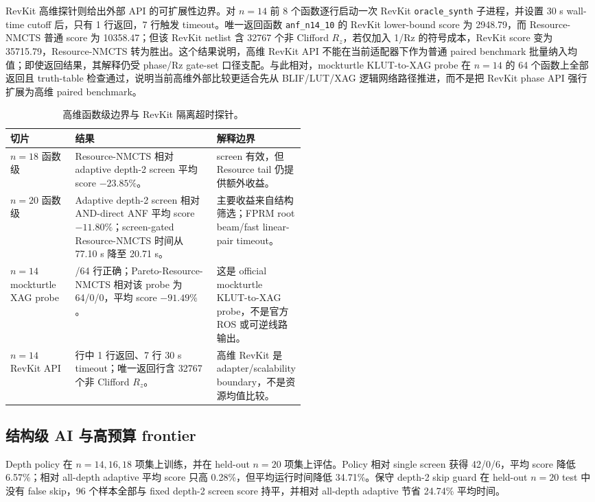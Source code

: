 \documentclass[UTF8,fontset=macnew,11pt]{ctexart}
\newcommand{\method}{Resource-NMCTS}
\begin{document}
RevKit 高维探针则给出外部 API 的可扩展性边界。对 $n=14$ 前 8 个函数逐行启动一次 RevKit \texttt{oracle\_synth} 子进程，并设置 30 s wall-time cutoff 后，只有 1 行返回，7 行触发 timeout。唯一返回函数 \texttt{anf\_n14\_10} 的 RevKit lower-bound score 为 2948.79，而 \method{} 普通 score 为 10358.47；但该 RevKit netlist 含 32767 个非 Clifford $R_z$，若仅加入 1/Rz 的符号成本，RevKit score 变为 35715.79，\method{} 转为胜出。这个结果说明，高维 RevKit API 不能在当前适配器下作为普通 paired benchmark 批量纳入均值；即使返回结果，其解释仍受 phase/Rz gate-set 口径支配。与此相对，mockturtle KLUT-to-XAG probe 在 $n=14$ 的 64 个函数上全部返回且 truth-table 检查通过，说明当前高维外部比较更适合先从 BLIF/LUT/XAG 逻辑网络路径推进，而不是把 RevKit phase API 强行扩展为高维 paired benchmark。

\begin{table}[H]
\centering
\scriptsize
\caption{高维函数级边界与 RevKit 隔离超时探针。}
\label{tab:highdim-v27}
\begin{tabularx}{\linewidth}{>{\raggedright\arraybackslash}p{0.22\linewidth}>{\raggedright\arraybackslash}X>{\raggedright\arraybackslash}p{0.28\linewidth}}
\toprule
切片 & 结果 & 解释边界 \\
\midrule
$n=18$ 函数级 & \method{} 相对 adaptive depth-2 screen 平均 score $-23.85\%$。 & screen 有效，但 Resource tail 仍提供额外收益。 \\
$n=20$ 函数级 & Adaptive depth-2 screen 相对 AND-direct ANF 平均 score $-11.80\%$；screen-gated \method{} 时间从 77.10 s 降至 20.71 s。 & 主要收益来自结构筛选；FPRM root beam/fast linear-pair timeout。 \\
$n=14$ mockturtle XAG probe & 64/64 行正确；Pareto-\method{} 相对该 probe 为 64/0/0，平均 score $-91.49\%$。 & 这是 official mockturtle KLUT-to-XAG probe，不是官方 ROS 或可逆线路输出。 \\
$n=14$ RevKit API & 8 行中 1 行返回、7 行 30 s timeout；唯一返回行含 32767 个非 Clifford $R_z$。 & 高维 RevKit 是 adapter/scalability boundary，不是资源均值比较。 \\
\bottomrule
\end{tabularx}
\end{table}

\subsection{结构级 AI 与高预算 frontier}

Depth policy 在 $n=14,16,18$ 项集上训练，并在 held-out $n=20$ 项集上评估。Policy 相对 single screen 获得 42/0/6，平均 score 降低 6.57\%；相对 all-depth adaptive 平均 score 只高 0.28\%，但平均运行时间降低 34.71\%。保守 depth-2 skip guard 在 held-out $n=20$ test 中没有 false skip，96 个样本全部与 fixed depth-2 screen score 持平，并相对 all-depth adaptive 节省 24.74\% 平均时间。
\end{document}

